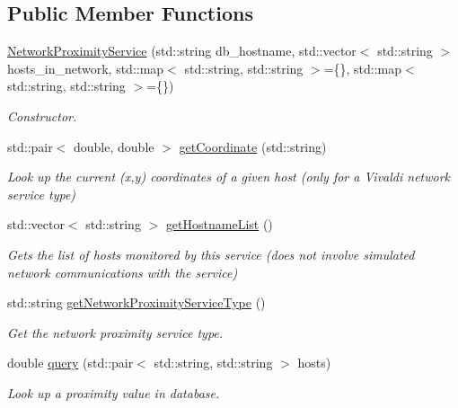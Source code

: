 \subsection*{Public Member Functions}
\begin{DoxyCompactItemize}
\item 
\hyperlink{classwrench_1_1_network_proximity_service_a8f7021f0fd9a5a6393fc447652c2371b}{Network\+Proximity\+Service} (std\+::string db\+\_\+hostname, std\+::vector$<$ std\+::string $>$ hosts\+\_\+in\+\_\+network, std\+::map$<$ std\+::string, std\+::string $>$=\{\}, std\+::map$<$ std\+::string, std\+::string $>$=\{\})
\begin{DoxyCompactList}\small\item\em Constructor. \end{DoxyCompactList}\item 
std\+::pair$<$ double, double $>$ \hyperlink{classwrench_1_1_network_proximity_service_af7392b6f906fa758328de9cfa283d1bc}{get\+Coordinate} (std\+::string)
\begin{DoxyCompactList}\small\item\em Look up the current (x,y) coordinates of a given host (only for a Vivaldi network service type) \end{DoxyCompactList}\item 
std\+::vector$<$ std\+::string $>$ \hyperlink{classwrench_1_1_network_proximity_service_a5e3f4189424c2d44db198efb7984e3ef}{get\+Hostname\+List} ()
\begin{DoxyCompactList}\small\item\em Gets the list of hosts monitored by this service (does not involve simulated network communications with the service) \end{DoxyCompactList}\item 
std\+::string \hyperlink{classwrench_1_1_network_proximity_service_a3a70bf6b279c431f5f9cffc4207822af}{get\+Network\+Proximity\+Service\+Type} ()
\begin{DoxyCompactList}\small\item\em Get the network proximity service type. \end{DoxyCompactList}\item 
double \hyperlink{classwrench_1_1_network_proximity_service_a3fe7aa39935af1eeeccdd18288f88068}{query} (std\+::pair$<$ std\+::string, std\+::string $>$ hosts)
\begin{DoxyCompactList}\small\item\em Look up a proximity value in database. \end{DoxyCompactList}\end{DoxyCompactItemize}
